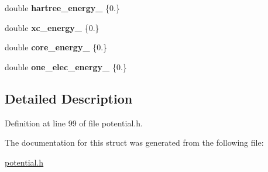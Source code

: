 \begin{DoxyCompactItemize}
\item 
\hypertarget{structsirius_1_1_potential_1_1paw__potential__data__t_a2a2a2ab9df170abd5c7add694620b1d2}{}double {\bfseries hartree\+\_\+energy\+\_\+} \{0.\}\label{structsirius_1_1_potential_1_1paw__potential__data__t_a2a2a2ab9df170abd5c7add694620b1d2}

\item 
\hypertarget{structsirius_1_1_potential_1_1paw__potential__data__t_a7f40e3cd80de75baa2ed0d4b07f78a80}{}double {\bfseries xc\+\_\+energy\+\_\+} \{0.\}\label{structsirius_1_1_potential_1_1paw__potential__data__t_a7f40e3cd80de75baa2ed0d4b07f78a80}

\item 
\hypertarget{structsirius_1_1_potential_1_1paw__potential__data__t_a0eb45c7589152392f9bbc190576e7fdf}{}double {\bfseries core\+\_\+energy\+\_\+} \{0.\}\label{structsirius_1_1_potential_1_1paw__potential__data__t_a0eb45c7589152392f9bbc190576e7fdf}

\item 
\hypertarget{structsirius_1_1_potential_1_1paw__potential__data__t_a12323c15703f1a22cbea9bb5b3ac9251}{}double {\bfseries one\+\_\+elec\+\_\+energy\+\_\+} \{0.\}\label{structsirius_1_1_potential_1_1paw__potential__data__t_a12323c15703f1a22cbea9bb5b3ac9251}

\end{DoxyCompactItemize}


\subsection{Detailed Description}


Definition at line 99 of file potential.\+h.



The documentation for this struct was generated from the following file\+:\begin{DoxyCompactItemize}
\item 
\hyperlink{potential_8h}{potential.\+h}\end{DoxyCompactItemize}
